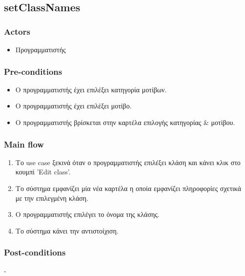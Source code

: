 \documentclass[../diploma_thesis.tex]{subfiles}
\begin{document}
\subsection{setClassNames}
\subsubsection{Actors}
\begin{itemize}
\item  Προγραμματιστής
\end{itemize}
\subsubsection{Pre-conditions}
\begin{itemize}
\item Ο προγραμματιστής έχει επιλέξει κατηγορία μοτίβων.
\item  Ο προγραμματιστής έχει επιλέξει μοτίβο.
\item Ο προγραμματιστής βρίσκεται στην καρτέλα επιλογής κατηγορίας \& μοτίβου.
\end{itemize}
\subsubsection{Main flow}
\begin{enumerate}
\item Το use case ξεκινά όταν ο προγραμματιστής επιλέξει κλάση και κάνει κλικ στο κουμπί 'Edit class'.
\item Το σύστημα εμφανίζει μία νέα καρτέλα η οποία εμφανίζει πληροφορίες σχετικά με την επιλεγμένη κλάση.
\item Ο προγραμματιστής επιλέγει το όνομα της κλάσης.
\item Το σύστημα κάνει την αντιστοίχιση.
\end{enumerate}
\subsubsection{Post-conditions}
-
\end{document}
